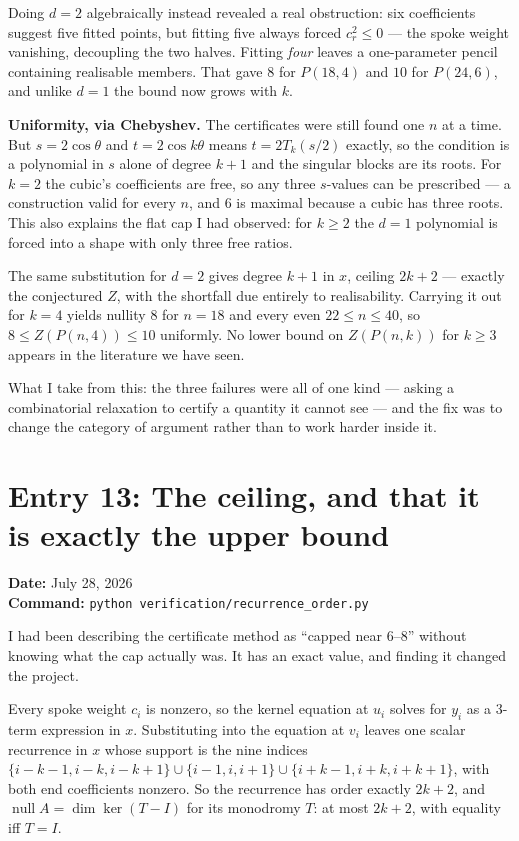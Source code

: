 \documentclass[12pt]{article}
\begin{document}
Doing $d=2$ algebraically instead revealed a real obstruction: six coefficients
suggest five fitted points, but fitting five always forced $c_r^{2}\le0$ ---
the spoke weight vanishing, decoupling the two halves. Fitting \emph{four}
leaves a one-parameter pencil containing realisable members. That gave $8$ for
$P(18,4)$ and $10$ for $P(24,6)$, and unlike $d=1$ the bound now grows with
$k$.

\textbf{Uniformity, via Chebyshev.} The certificates were still found one $n$ at
a time. But $s=2\cos\theta$ and $t=2\cos k\theta$ means $t=2T_k(s/2)$ exactly,
so the condition is a polynomial in $s$ alone of degree $k+1$ and the singular
blocks are its roots. For $k=2$ the cubic's coefficients are free, so any three
$s$-values can be prescribed --- a construction valid for every $n$, and $6$ is
maximal because a cubic has three roots. This also explains the flat cap I had
observed: for $k\ge2$ the $d=1$ polynomial is forced into a shape with only
three free ratios.

The same substitution for $d=2$ gives degree $k+1$ in $x$, ceiling $2k+2$ ---
exactly the conjectured $Z$, with the shortfall due entirely to realisability.
Carrying it out for $k=4$ yields nullity $8$ for $n=18$ and every even
$22\le n\le40$, so $8\le Z(P(n,4))\le10$ uniformly. No lower bound on
$Z(P(n,k))$ for $k\ge3$ appears in the literature we have seen.

What I take from this: the three failures were all of one kind --- asking a
combinatorial relaxation to certify a quantity it cannot see --- and the fix
was to change the category of argument rather than to work harder inside it.


\clearpage
\section*{Entry 13: The ceiling, and that it is exactly the upper bound}
\textbf{Date:} July 28, 2026\\
\textbf{Command:} {\small\texttt{python verification/recurrence\_order.py}}

I had been describing the certificate method as ``capped near $6$--$8$'' without
knowing what the cap actually was. It has an exact value, and finding it
changed the project.

Every spoke weight $c_i$ is nonzero, so the kernel equation at $u_i$ solves for
$y_i$ as a $3$-term expression in $x$. Substituting into the equation at $v_i$
leaves one scalar recurrence in $x$ whose support is the nine indices
$\{i{-}k{-}1,i{-}k,i{-}k{+}1\}\cup\{i{-}1,i,i{+}1\}\cup\{i{+}k{-}1,i{+}k,i{+}k{+}1\}$,
with both end coefficients nonzero. So the recurrence has order exactly
$2k+2$, and $\operatorname{null}A=\dim\ker(T-I)$ for its monodromy $T$: at most
$2k+2$, with equality iff $T=I$.
\end{document}
